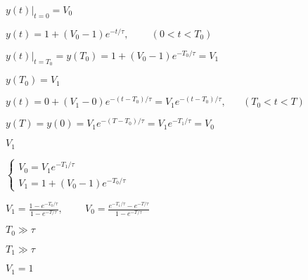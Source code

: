 \documentclass{article}
\def\lthtmlcheckvsize{\ifdim\ht\sizebox<\vsize 
  \ifdim\wd\sizebox<\hsize\expandafter\hfill\fi \expandafter\vfill
  \else\expandafter\vss\fi}%
\begin{document}
{\newpage\clearpage
{}%
$ y(t)\big|_{t=0}=V_0$%
\lthtmlindisplaymathZ
\lthtmlcheckvsize\clearpage}

{\newpage\clearpage
{}%
$\displaystyle y(t)=1+(V_0-1)e^{-t/\tau},\;\;\;\;\;\;\;\;(0<t<T_0)$%
\lthtmlindisplaymathZ
\lthtmlcheckvsize\clearpage}

{\newpage\clearpage
{}%
$ y(t)\big|_{t=T_0}=y(T_0)=1+(V_0-1)e^{-T_0/\tau}=V_1$%
\lthtmlindisplaymathZ
\lthtmlcheckvsize\clearpage}

{\newpage\clearpage
{}%
$ y(T_0)=V_1$%
\lthtmlindisplaymathZ
\lthtmlcheckvsize\clearpage}

{\newpage\clearpage
{}%
$\displaystyle y(t)=0+(V_1-0)e^{-(t-T_0)/\tau}=V_1 e^{-(t-T_0)/\tau},\;\;\;\;\;\;(T_0<t<T)$%
\lthtmlindisplaymathZ
\lthtmlcheckvsize\clearpage}

{\newpage\clearpage
{}%
$ y(T)=y(0)=V_1 e^{-(T-T_0)/\tau}=V_1 e^{-T_1/\tau}=V_0$%
\lthtmlindisplaymathZ
\lthtmlcheckvsize\clearpage}

{\newpage\clearpage
{}%
$ V_1$%
\lthtmlindisplaymathZ
\lthtmlcheckvsize\clearpage}

{\newpage\clearpage
{}%
$\displaystyle \left\{\begin{array}{l} V_0=V_1 e^{-T_1/\tau}\\V_1=1+(V_0-1)e^{-T_0/\tau}\end{array}\right.$%
\lthtmlindisplaymathZ
\lthtmlcheckvsize\clearpage}

{\newpage\clearpage
{}%
$\displaystyle V_1=\frac{1-e^{-T_0/\tau}}{1-e^{-T/\tau}},\;\;\;\;\;\;\;\;
V_0=\frac{e^{-T_1/\tau}-e^{-T/\tau}}{1-e^{-T/\tau}}$%
\lthtmlindisplaymathZ
\lthtmlcheckvsize\clearpage}

{\newpage\clearpage
{}%
$ T_0\gg\tau$%
\lthtmlindisplaymathZ
\lthtmlcheckvsize\clearpage}

{\newpage\clearpage
{}%
$ T_1\gg\tau$%
\lthtmlindisplaymathZ
\lthtmlcheckvsize\clearpage}

{\newpage\clearpage
{}%
$ V_1=1$%
\lthtmlindisplaymathZ
\lthtmlcheckvsize\clearpage}
\end{document}
